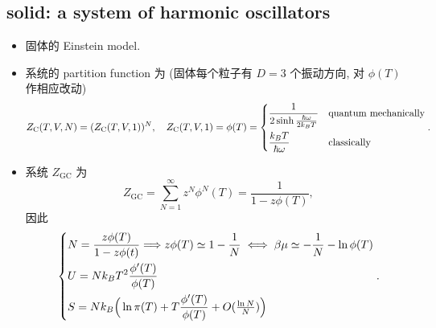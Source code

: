 \subsection{solid: a system of harmonic oscillators}
\begin{itemize}
	\item 固体的 Einstein model.
	
	\item 系统的 partition function 为 (固体每个粒子有 $D = 3$ 个振动方向, 对 $\phi(T)$ 作相应改动)
	\begin{equation}
		Z_\text{C}(T, V, N) = (Z_\text{C}(T, V, 1))^N, \quad Z_\text{C}(T, V, 1) = \phi(T) = \begin{dcases}
			\frac{1}{2 \sinh \frac{\hbar \omega}{2 k_B T}} & \text{quantum mechanically} \\
			\frac{k_B T}{\hbar \omega} & \text{classically}
		\end{dcases}.
	\end{equation}
	
	\item 系统 $Z_\text{GC}$ 为
	\begin{equation}
		Z_\text{GC} = \sum_{N = 1}^\infty z^N \phi^N(T) = \frac{1}{1 - z \phi(T)},
	\end{equation}
	因此
	\begin{equation} \label{4.5.7}
		\begin{dcases}
			N = \frac{z \phi(T)}{1 - z \phi(t)} \Longrightarrow z \phi(T) \simeq 1 - \frac{1}{N} \iff \beta \mu \simeq - \frac{1}{N} - \ln \phi(T) \\
			U = N k_B T^2 \frac{\phi'(T)}{\phi(T)} \\
			S = N k_B \Big( \ln \pi(T) + T \frac{\phi'(T)}{\phi(T)} + O({\textstyle \frac{\ln N}{N}}) \Big)
		\end{dcases}.
	\end{equation}
\end{itemize}

